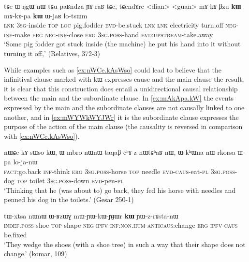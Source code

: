 \documentclass[oldfontcommands,oneside,a4paper,11pt]{article}
\newcommand{\ipa}[1]{{\phon #1}} %
\begin{document}
\begin{exe}
\ex \label{ex:mAkApa.kW}
\gll
\ipa{tɕe}   	\ipa{ɯ-ŋgɯ}   	\ipa{nɯ} \ipa{tɕu}   	\ipa{paʁndza}   	\ipa{ɲɤ-raʁ}   	\ipa{tɕe,}   	\ipa{tɕendɤre}   	<dian>   	<guan>   	\ipa{mɤ-kɤ-βzu} 	\ipa{\textbf{kɯ}}   	\ipa{mɤ-kɤ-pa}   	\ipa{\textbf{kɯ}}   	\ipa{ɯ-jaʁ}   	\ipa{lo-tsɯm}   \\
\textsc{lnk} \textsc{3sg}-inside \textsc{top} \textsc{loc} pig.fodder \textsc{evd}-be.stuck \textsc{lnk}
\textsc{lnk} electricity turn.off \textsc{neg-inf}-make \textsc{erg}  \textsc{neg-inf}-close \textsc{erg}  \textsc{3sg.poss}-hand \textsc{evd:upstream}-take.away \\
\glt `Some pig fodder got stuck inside (the machine) he put his hand into it without turning it off,' (Relatives, 372-3)
\end{exe} 

 While  examples such as \ref{ex:nWCe.kAsWso} could lead to believe that the infinitival clause marked with \ipa{kɯ}  expresses  cause and the main clause the result, it is clear that this construction does entail a unidirectional causal relationship between the main and the subordinate clause. In \ref{ex:mAkApa.kW} the events expressed by the main and the subordinate clauses are not causally linked to one another, and in  \ref{ex:mWYWkWYJWr} it is the subordinate clause expresses the purpose of the action of the main clause (the causality is reversed in comparison with \ref{ex:nWCe.kAsWso}).

  \begin{exe}
\ex \label{ex:nWCe.kAsWso}
\gll 
\ipa{nɯɕe}  	\ipa{kɤ-sɯso}  	\ipa{kɯ,}  	\ipa{ɯ-mbro}  	\ipa{nɯnɯ}  	\ipa{taqaβ}  	\ipa{cʰɤ-z-nɯtɕʰaʁ-nɯ,}  	\ipa{ɯ-kʰɯna}  	\ipa{nɯ}  	\ipa{rkorsa}  	\ipa{ɯ-pa}  	\ipa{lo-ja-nɯ}  \\
\textsc{fact}:go.back \textsc{inf}-think \textsc{erg} \textsc{3sg.poss}-horse \textsc{top} needle \textsc{evd-caus}-eat-\textsc{pl}   \textsc{3sg.poss}-dog \textsc{top} toilet \textsc{3sg.poss}-down \textsc{evd}-pen-\textsc{pl} \\
\glt `Thinking that he (was about to) go back, they fed his horse with needles and penned his dog in the toilets.' (Gesar 250-1)
 \end{exe} 
 
 

\begin{exe}
\ex \label{ex:mWYWkWYJWr}
\gll
\ipa{tɯ-xtsa}   	\ipa{nɯnɯ}   	\ipa{ɯ-ʁzɯɣ}   	\ipa{mɯ-ɲɯ-kɯ-ɲɟɯr}   	\ipa{\textbf{kɯ}}   	\ipa{ɲɯ-z-rɤsta-nɯ}   \\
\textsc{indef.poss}-shoe \textsc{top} shape \textsc{neg-ipfv-inf:non.hum-anticaus}:change \textsc{erg} \textsc{ipfv-caus}-be.fixed \\
\glt `They wedge the shoes (with a shoe tree)  in such a way that their shape does not change.' (komar, 109)
\end{exe}
\end{document}
